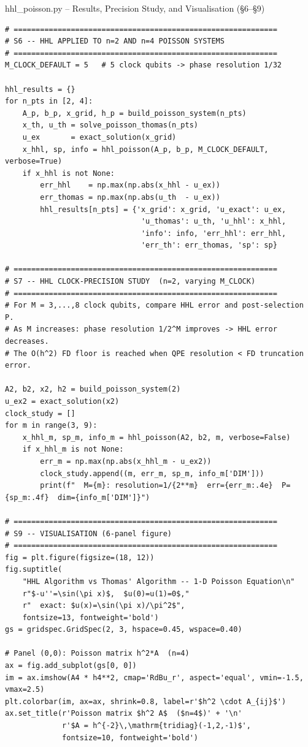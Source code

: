 \documentclass{beamer}
\begin{document}
\begin{frame}{hhl\_poisson.py -- Results, Precision Study, and Visualisation (\S6--\S9)}
\begin{lstlisting}
# ============================================================
# S6 -- HHL APPLIED TO n=2 AND n=4 POISSON SYSTEMS
# ============================================================
M_CLOCK_DEFAULT = 5   # 5 clock qubits -> phase resolution 1/32

hhl_results = {}
for n_pts in [2, 4]:
    A_p, b_p, x_grid, h_p = build_poisson_system(n_pts)
    x_th, u_th = solve_poisson_thomas(n_pts)
    u_ex       = exact_solution(x_grid)
    x_hhl, sp, info = hhl_poisson(A_p, b_p, M_CLOCK_DEFAULT, verbose=True)
    if x_hhl is not None:
        err_hhl    = np.max(np.abs(x_hhl - u_ex))
        err_thomas = np.max(np.abs(u_th  - u_ex))
        hhl_results[n_pts] = {'x_grid': x_grid, 'u_exact': u_ex,
                               'u_thomas': u_th, 'u_hhl': x_hhl,
                               'info': info, 'err_hhl': err_hhl,
                               'err_th': err_thomas, 'sp': sp}

# ============================================================
# S7 -- HHL CLOCK-PRECISION STUDY  (n=2, varying M_CLOCK)
# ============================================================
# For M = 3,...,8 clock qubits, compare HHL error and post-selection P.
# As M increases: phase resolution 1/2^M improves -> HHL error decreases.
# The O(h^2) FD floor is reached when QPE resolution < FD truncation error.

A2, b2, x2, h2 = build_poisson_system(2)
u_ex2 = exact_solution(x2)
clock_study = []
for m in range(3, 9):
    x_hhl_m, sp_m, info_m = hhl_poisson(A2, b2, m, verbose=False)
    if x_hhl_m is not None:
        err_m = np.max(np.abs(x_hhl_m - u_ex2))
        clock_study.append((m, err_m, sp_m, info_m['DIM']))
        print(f"  M={m}: resolution=1/{2**m}  err={err_m:.4e}  P={sp_m:.4f}  dim={info_m['DIM']}")

# ============================================================
# S9 -- VISUALISATION (6-panel figure)
# ============================================================
fig = plt.figure(figsize=(18, 12))
fig.suptitle(
    "HHL Algorithm vs Thomas' Algorithm -- 1-D Poisson Equation\n"
    r"$-u''=\sin(\pi x)$,  $u(0)=u(1)=0$,"
    r"  exact: $u(x)=\sin(\pi x)/\pi^2$",
    fontsize=13, fontweight='bold')
gs = gridspec.GridSpec(2, 3, hspace=0.45, wspace=0.40)

# Panel (0,0): Poisson matrix h^2*A  (n=4)
ax = fig.add_subplot(gs[0, 0])
im = ax.imshow(A4 * h4**2, cmap='RdBu_r', aspect='equal', vmin=-1.5, vmax=2.5)
plt.colorbar(im, ax=ax, shrink=0.8, label=r'$h^2 \cdot A_{ij}$')
ax.set_title(r'Poisson matrix $h^2 A$  ($n=4$)' + '\n'
             r'$A = h^{-2}\,\mathrm{tridiag}(-1,2,-1)$',
             fontsize=10, fontweight='bold')


\end{lstlisting}
\end{frame}
\end{document}
